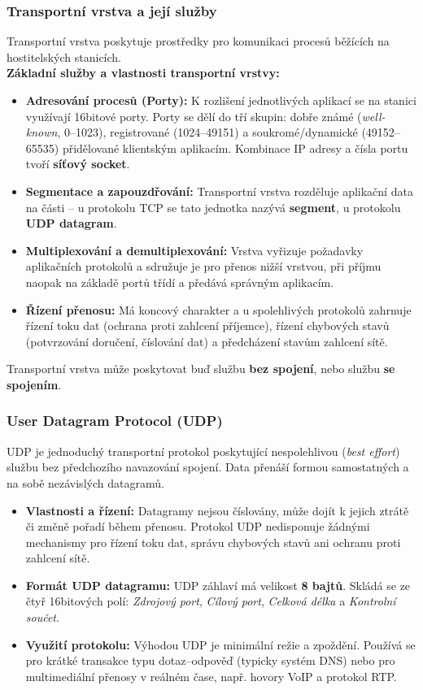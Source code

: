     \subsubsection{Transportní vrstva a její služby}
        Transportní vrstva poskytuje prostředky pro komunikaci procesů běžících na hostitelských stanicích.\\
        \textbf{Základní služby a vlastnosti transportní vrstvy:}
        \begin{itemize}
            \item \textbf{Adresování procesů (Porty):} K rozlišení jednotlivých aplikací se na stanici využívají 16bitové porty. Porty se dělí do tří skupin: dobře známé (\textit{well-known}, 0--1023), registrované (1024--49151) a soukromé/dynamické (49152--65535) přidělované klientským aplikacím. Kombinace IP adresy a čísla portu tvoří \textbf{síťový socket}.
            \item \textbf{Segmentace a zapouzdřování:} Transportní vrstva rozděluje aplikační data na části -- u protokolu TCP se tato jednotka nazývá \textbf{segment}, u protokolu \textbf{UDP datagram}.
            \item \textbf{Multiplexování a demultiplexování:} Vrstva vyřizuje požadavky aplikačních protokolů a sdružuje je pro přenos nižší vrstvou, při příjmu naopak na základě portů třídí a předává správným aplikacím.
            \item \textbf{Řízení přenosu:} Má koncový charakter a u spolehlivých protokolů zahrnuje řízení toku dat (ochrana proti zahlcení příjemce), řízení chybových stavů (potvrzování doručení, číslování dat) a předcházení stavům zahlcení sítě.
        \end{itemize}
        Transportní vrstva může poskytovat buď službu \textbf{bez spojení}, nebo službu \textbf{se spojením}.
    \subsubsection{User Datagram Protocol (UDP)}
        UDP je jednoduchý transportní protokol poskytující nespolehlivou (\textit{best effort}) službu bez předchozího navazování spojení. Data přenáší formou samostatných a na sobě nezávislých datagramů.
        \begin{itemize}
            \item \textbf{Vlastnosti a řízení:} Datagramy nejsou číslovány, může dojít k jejich ztrátě či změně pořadí během přenosu. Protokol UDP nedisponuje žádnými mechanismy pro řízení toku dat, správu chybových stavů ani ochranu proti zahlcení sítě.
            \item \textbf{Formát UDP datagramu:} UDP záhlaví má velikost \textbf{8 bajtů}. Skládá se ze čtyř 16bitových polí: \textit{Zdrojový port}, \textit{Cílový port}, \textit{Celková délka} a \textit{Kontrolní součet}.
            \item \textbf{Využití protokolu:} Výhodou UDP je minimální režie a zpoždění. Používá se pro krátké transakce typu dotaz--odpověď (typicky systém DNS) nebo pro multimediální přenosy v reálném čase, např. hovory VoIP a protokol RTP.
        \end{itemize}
